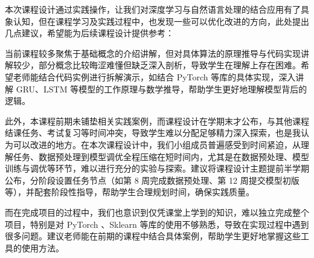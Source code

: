 本次课程设计通过实践操作，让我们对深度学习与自然语言处理的结合应用有了具象认知，但在课程学习及实践过程中，也发现一些可以优化改进的方向，此处提出几点建议，希望能为后续课程设计提供参考：

当前课程较多聚焦于基础概念的介绍讲解，但对具体算法的原理推导与代码实现讲解较少，部分概念比较晦涩难懂但缺乏深入剖析，导致学生在理解上存在困难。希望老师能结合代码实例进行拆解演示，如结合 PyTorch 等库的具体实现，深入讲解 GRU、LSTM 等模型的工作原理与数学推导，帮助学生更好地理解模型背后的逻辑。

此外，本课程前期未铺垫相关实践案例，而课程设计在学期末才公布，与其他课程结课任务、考试复习等时间冲突，导致学生难以分配足够精力深入探索，也是我认为可以改进的地方。在本次课程设计中，我们小组成员普遍感受到时间紧迫，从理解任务、数据预处理到模型调优全程压缩在短时间内，尤其是在数据预处理、模型训练与调优等环节，难以进行充分的实验与探索。建议将课程设计主题提前半学期公布，分阶段设置任务节点（如第 8 周完成数据预处理、第 12 周提交模型初版等），并配套阶段性指导，帮助学生合理规划时间，确保实践质量。

而在完成项目的过程中，我们也意识到仅凭课堂上学到的知识，难以独立完成整个项目，特别是对 PyTorch 、Sklearn 等库的使用不够熟悉，导致在实现过程中遇到很多问题。建议老师能在前期的课程中结合具体案例，帮助学生更好地掌握这些工具的使用方法。